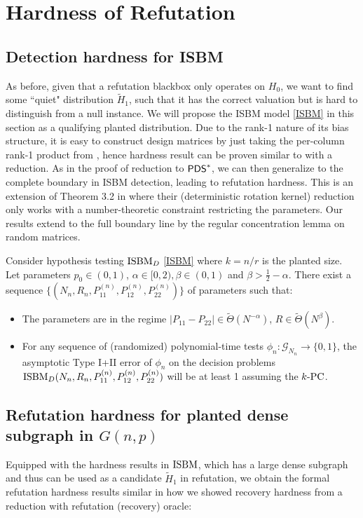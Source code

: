 \documentclass[final,12pt]{colt2023} %
\newcommand\1[1]{\mathbb{I}_{\left\{#1\right\}}}
\begin{document}
\section{Hardness of Refutation}
\subsection{Detection hardness for ISBM}
As before, given that a refutation blackbox only operates on $H_0$, we want to find some ``quiet" distribution $\tilde H_1$, such that it has the correct valuation but is hard to distinguish from a null instance. We will propose the ISBM model \eqref{ISBM} in this section as a qualifying planted distribution. Due to the rank-1 nature of its bias structure, it is easy to construct design matrices by just taking the per-column rank-1 product from , hence hardness result can be proven similar to 
 with a reduction. As in the proof of reduction to $\mathsf{PDS}^*$, we can then generalize to the complete boundary in ISBM detection, leading to refutation hardness. This is an extension of Theorem 3.2 in \cite{BB20} where their (deterministic rotation kernel) reduction only works with a number-theoretic constraint restricting the parameters. Our results extend to the full boundary line by the regular concentration lemma on random matrices.
\begin{theorem}\label{ISBMBound}
Consider hypothesis testing $\textup{ISBM}_D$ \eqref{ISBM} where $k=n/r$ is the planted size. Let parameters $p_0\in(0, 1)$, $\alpha\in[0,2), \beta\in (0,1)$ and $\beta>\frac{1}{2}-\alpha$. There exist a sequence $\{(N_n, R_n, P_{11}^{(n)}, P_{12}^{(n)},P_{22}^{(n)})\}$ of parameters such that:
\begin{itemize}
\item The parameters are in the regime $|P_{11}-P_{22}|\in \tilde\Theta(N^{-\alpha})$, $R\in\tilde\Theta(N^\beta)$.
\item For any sequence of (randomized) polynomial-time tests $\phi_n : \mathcal{G}_{N_n} \to \{0, 1\}$, the asymptotic
Type I+II error of $\phi_n$ on the decision problems $\textup{ISBM}_D(N_n, R_n, P_{11}^{(n)}, P_{12}^{(n)},P_{22}^{(n)})$ will be at least 1 assuming the $k\textup{-PC}$. 
\end{itemize}
\end{theorem}
\subsection{Refutation hardness for planted dense subgraph in $G(n, p)$}
Equipped with the hardness results in $\textup{ISBM}$, which has a large dense subgraph and thus can be used as a candidate $\tilde H_1$ in refutation, we obtain the formal refutation hardness results similar in how we showed recovery hardness from a reduction with refutation (recovery) oracle:
\end{document}
